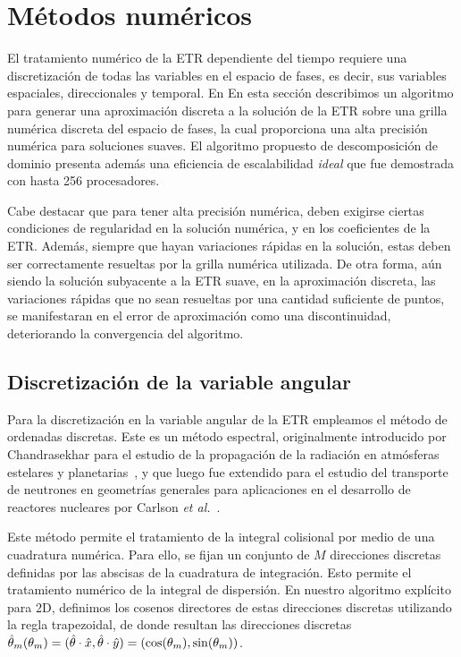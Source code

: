 \section{Métodos numéricos}
\label{sec:nummet}

El tratamiento numérico de la ETR dependiente del tiempo
requiere una discretización de todas las variables en el espacio de fases,
 es decir, sus variables espaciales, direccionales y temporal. En
En esta sección describimos un algoritmo para generar una 
aproximación discreta a la solución de la ETR sobre una 
grilla numérica discreta del 
espacio de fases, la cual proporciona una alta precisión numérica 
para soluciones suaves. El algoritmo propuesto 
de descomposición de dominio presenta además una eficiencia 
de escalabilidad \textit{ideal} 
que fue demostrada con hasta 256 procesadores. 

Cabe destacar que para tener alta precisión numérica, 
deben exigirse ciertas condiciones de regularidad 
en la solución numérica, y en los coeficientes 
de la ETR. Además, siempre que hayan variaciones 
rápidas en la solución, estas deben ser correctamente 
resueltas por la grilla numérica utilizada. De 
otra forma, aún siendo la solución subyacente 
a la ETR suave, en la aproximación discreta, 
las variaciones rápidas que no sean resueltas 
por una cantidad suficiente de puntos, se manifestaran 
en el error de aproximación como una discontinuidad, 
deteriorando la convergencia del algoritmo. 

\subsection{Discretización de la variable angular}
\label{sec:dord}
Para la discretización en la variable angular de la ETR empleamos el
método de ordenadas discretas. Este es un método espectral, 
originalmente introducido por Chandrasekhar 
para el estudio de la propagación de la radiación en atmósferas 
estelares y planetarias~\cite{Chandrasekhar1960}, 
y que luego fue extendido para el estudio 
del transporte de neutrones en geometrías generales 
para aplicaciones en el desarrollo de reactores nucleares  
por Carlson \textit{et al.}~\cite{Lathrop1992}. 

Este método permite el tratamiento de la integral colisional por medio de una 
cuadratura numérica. Para ello, se fijan 
un conjunto de $M$ direcciones discretas 
definidas por las abscisas 
de la cuadratura de integración. Esto permite el tratamiento 
numérico de la integral 
de dispersión. 
En nuestro algoritmo explícito para 2D, definimos los cosenos directores de 
estas direcciones discretas utilizando la regla trapezoidal, 
de donde resultan las direcciones discretas 
$\hat{\theta}_m(\theta_m)=(\hat{\theta}\cdot \hat x,\hat{\theta}\cdot \hat y)=(\cos(\theta_m),\sin(\theta_m))$.

